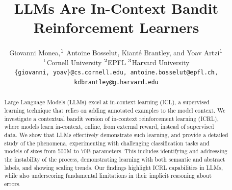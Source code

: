 \documentclass{article}
\title{LLMs Are In-Context Bandit Reinforcement Learners}
\author{Giovanni Monea,$^1$ Antoine Bosselut,\textsuperscript{\epflid} Kianté Brantley,\textsuperscript{\harvardid} and Yoav Artzi$^1$ \\
$^1$Cornell University \hspace{2em} $^2$EPFL \hspace{2em} $^3$Harvard University\\
\texttt{\{giovanni, yoav\}@cs.cornell.edu, antoine.bosselut@epfl.ch,}\\
\texttt{kdbrantley@g.harvard.edu}
}
\theoremstyle{plain}
\theoremstyle{definition}
\theoremstyle{remark}
\begin{document}
\ifcolmsubmission
\linenumbers
\fi
\maketitle
\begin{abstract}
Large Language Models (LLMs) excel at in-context learning (ICL), a supervised learning technique that relies on adding annotated examples to the model context. We investigate a contextual bandit version of in-context reinforcement learning (ICRL), where models learn in-context, online, from external reward, instead of supervised data. We show that LLMs effectively demonstrate such learning, and provide a detailed study of the phenomena, experimenting with challenging classification tasks and models of sizes from 500M to 70B parameters. This includes identifying and addressing the instability of the process, demonstrating learning with both semantic and abstract labels, and showing scaling trends. Our findings highlight ICRL capabilities in LLMs, while also underscoring fundamental limitations in their implicit reasoning about errors.
\end{abstract}
\end{document}

